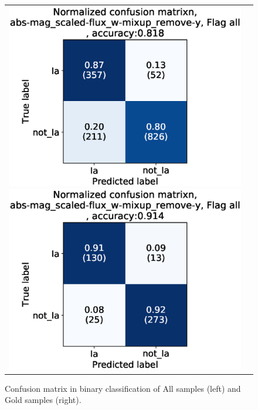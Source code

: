 \documentclass[useamsfonts]{pasj01}
\begin{document}
\begin{figure}[ht]
    \begin{tabular}{cc}
        \begin{minipage}{0.5\hsize}
            \begin{center}
                \includegraphics[width=\columnwidth]{figures/10_CM_abs-mag_scaled-flux_w-mixup_remove-y_predictions_test_2_Flagall_all.eps}
            \end{center}
        \end{minipage}
        \begin{minipage}{0.5\hsize}
            \begin{center}
                \includegraphics[width=\columnwidth]{figures/10_CM_abs-mag_scaled-flux_w-mixup_remove-y_predictions_test_2_Flagall_noedge_spec.eps}
            \end{center}
        \end{minipage}
    \end{tabular}
    \caption{%
  Confusion matrix in binary classification of All samples (left) and Gold samples (right).
}%
    \label{fig:h2_test_CM}
\end{figure}
%
%
\end{document}
